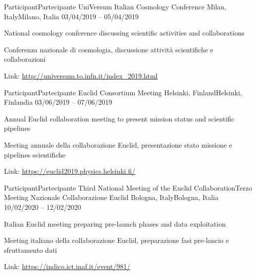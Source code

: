 


\begin{cventries}


\cventry
{\ifenglish Participant\else Partecipante\fi} %
{UniVersum Italian Cosmology Conference} %
{\ifenglish Milan, Italy\else Milano, Italia\fi} %
{03/04/2019 -- 05/04/2019} %
{ %
\begin{cvitems}
\ifenglish
\item {National cosmology conference discussing scientific activities and collaborations}
\else
\item {Conferenza nazionale di cosmologia, discussione attività scientifiche e collaborazioni}
\fi
\item {Link: \url{http://universum.to.infn.it/index_2019.html}}
\end{cvitems}
}


\cventry
{\ifenglish Participant\else Partecipante\fi} %
{Euclid Consortium Meeting} %
{\ifenglish Helsinki, Finland\else Helsinki, Finlandia\fi} %
{03/06/2019 -- 07/06/2019} %
{ %
\begin{cvitems}
\ifenglish
\item {Annual Euclid collaboration meeting to present mission status and scientific pipelines}
\else
\item {Meeting annuale della collaborazione Euclid, presentazione stato missione e pipelines scientifiche}
\fi
\item {Link: \url{https://euclid2019.physics.helsinki.fi/}}
\end{cvitems}
}


\cventry
{\ifenglish Participant\else Partecipante\fi} %
{\ifenglish Third National Meeting of the Euclid Collaboration\else Terzo Meeting Nazionale Collaborazione Euclid\fi} %
{\ifenglish Bologna, Italy\else Bologna, Italia\fi} %
{10/02/2020 -- 12/02/2020} %
{ %
\begin{cvitems}
\ifenglish
\item {Italian Euclid meeting preparing pre-launch phases and data exploitation}
\else
\item {Meeting italiano della collaborazione Euclid, preparazione fasi pre-lancio e sfruttamento dati}
\fi
\item {Link: \url{https://indico.ict.inaf.it/event/981/}}
\end{cvitems}
}


\end{cventries}
